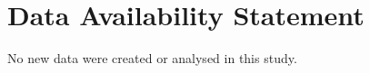 \documentclass[preprint,amsmath,amssymb,aps,prl,superscriptaddress,nofootinbib,floatfix]{revtex4-2}
\newcommand{\data}[1]{%
  \section*{Data Availability Statement}#1%
}
\begin{document}

\data{No new data were created or analysed in this study.}%



\end{document}
